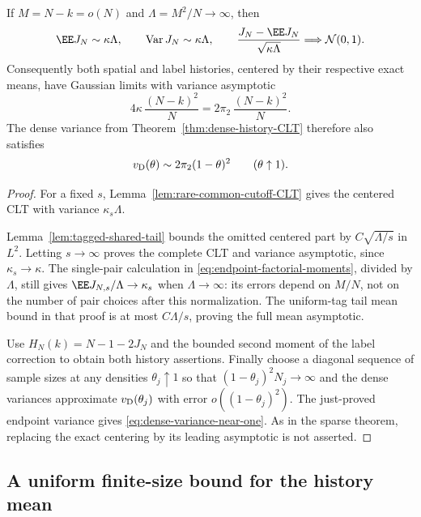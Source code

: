 \documentclass[11pt,letterpaper]{article}
\begin{document}
\begin{theorem}
\label{thm:endpoint-Gaussian}
If $M=N-k=o(N)$ and $\Lambda=M^2/N\to\infty$, then
\begin{equation}\label{eq:endpoint-Gaussian}
 \EE J_N\sim\kappa\Lambda,\qquad
 \operatorname{Var}J_N\sim\kappa\Lambda,\qquad
 \frac{J_N-\EE J_N}{\sqrt{\kappa\Lambda}}
                       \Longrightarrow\mathcal N(0,1).
\end{equation}
Consequently both spatial and label histories, centered
by their respective exact means, have Gaussian limits with
variance asymptotic
\[
 4\kappa\,\frac{(N-k)^2}{N}
       =2\pi_2\,\frac{(N-k)^2}{N}.
\]
The dense variance from Theorem~\ref{thm:dense-history-CLT}
therefore also satisfies
\begin{equation}\label{eq:dense-variance-near-one}
 v_{\rm D}(\theta)\sim2\pi_2(1-\theta)^2
                                      \qquad(\theta\uparrow1).
\end{equation}
\end{theorem}
\begin{proof}
For a fixed $s$, Lemma~\ref{lem:rare-common-cutoff-CLT}
gives the centered CLT with variance $\kappa_s\Lambda$.

Lemma~\ref{lem:tagged-shared-tail} bounds the omitted centered
part by $C\sqrt{\Lambda/s}$ in $L^2$.
Letting $s\to\infty$ proves the complete CLT and variance
asymptotic, since $\kappa_s\to\kappa$.
The single-pair calculation in
\eqref{eq:endpoint-factorial-moments}, divided by $\Lambda$,
still gives $\EE J_{N,s}/\Lambda\to\kappa_s$ when
$\Lambda\to\infty$: its errors depend on $M/N$, not on the
number of pair choices after this normalization.
The uniform-tag tail mean bound in that proof is at most
$C\Lambda/s$, proving the full mean asymptotic.

Use $H_N(k)=N-1-2J_N$ and the bounded second moment of
the label correction to obtain both history assertions.
Finally choose a diagonal sequence of sample sizes at any
densities $\theta_j\uparrow1$ so that
$(1-\theta_j)^2N_j\to\infty$ and the dense variances approximate
$v_{\rm D}(\theta_j)$ with error $o((1-\theta_j)^2)$.
The just-proved endpoint variance gives
\eqref{eq:dense-variance-near-one}.
As in the sparse theorem, replacing the exact centering by
its leading asymptotic is not asserted.
\end{proof}

\subsection{A uniform finite-size bound for the history mean}
\label{sec:profile-centering}
\end{document}
